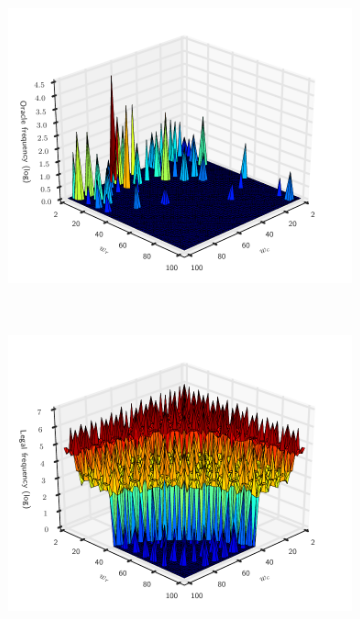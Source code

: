 \begin{figure}
  \centering
  \begin{subfigure}[t]{0.45\textwidth}
    \centering
    \includegraphics[width=\textwidth]{img/oracle_param_space}
    \vspace{-1.5em} %
    \caption{}
    \label{fig:oracle-wgsizes}
  \end{subfigure}
  ~%
  \begin{subfigure}[t]{0.45\textwidth}
    \centering
    \includegraphics[width=\textwidth]{img/coverage_space}
    \vspace{-1.5em} %

\end{subfigure}
\end{figure}
